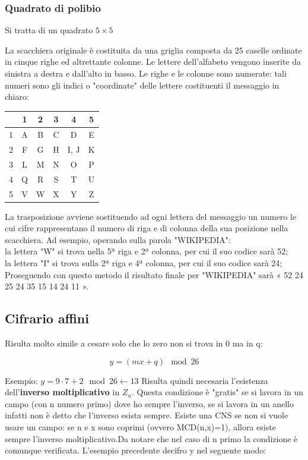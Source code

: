 \documentclass[10pt,a4paper]{article}
\begin{document}
\subsubsection{Quadrato di polibio}
Si tratta di un quadrato $5 \times 5$

La scacchiera originale è costituita da una griglia composta da 25 caselle ordinate in cinque righe ed altrettante colonne. Le lettere dell'alfabeto vengono inserite da sinistra a destra e dall'alto in basso. Le righe e le colonne sono numerate: tali numeri sono gli indici o "coordinate" delle lettere costituenti il messaggio in chiaro:
\begin{center}
\begin{tabular}{c|c|c|c|c|c|}
 & 1& 	2& 	3& 	4& 	5\\
 \hline
 1& 	A& 	B& 	C& 	D& 	E\\
 2& 	F& 	G& 	H& 	I, J& 	K\\
3& 	L& 	M& 	N& 	O& 	P\\
4& 	Q& 	R& 	S& 	T& 	U\\
5& 	V& 	W& 	X& 	Y& 	Z\\
\end{tabular}
\end{center}



La trasposizione avviene sostituendo ad ogni lettera del messaggio un numero le cui cifre rappresentano il numero di riga e di colonna della sua posizione nella scacchiera. Ad esempio, operando sulla parola "WIKIPEDIA":\\

    la lettera "W" si trova nella 5ª riga e 2ª colonna, per cui il suo codice sarà 52;\\
    la lettera "I" si trova sulla 2ª riga e 4ª colonna, per cui il suo codice sarà 24;\\

Proseguendo con questo metodo il risultato finale per "WIKIPEDIA" sarà « 52 24 25 24 35 15 14 24 11 ».
\subsection{Cifrario affini}
Risulta molto simile a cesare solo che lo zero non si trova in 0 ma in q:

$$y=(mx+q)\mod26$$

Esempio: $y=9\cdot7+2\mod26 \leftarrow13$
Risulta quindi necesaria l'esistenza dell'\textbf{inverso moltiplicativo} in $Z_n$. Questa condizione è "gratis" se si lavora in un campo (con n numero primo) dove ho sempre l'inverso, se si lavora in un anello infatti non è detto che l'inverso esista sempre. Esiste una CNS se non si vuole usare un campo: se n e x sono coprimi (ovvero MCD(n,x)=1), allora esiste sempre l'inverso moltiplicativo.Da notare che nel caso di n primo la condizione è comunque verificata.
L'esempio precedente decifro y nel seguente modo:
\end{document}
